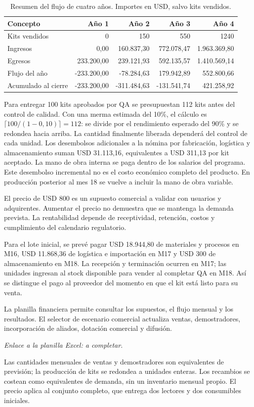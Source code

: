 \begin{table}[H]\centering\small
\caption{Resumen del flujo de cuatro años. Importes en USD, salvo kits vendidos.}\label{tab:flujo-cuatro-anios}
\begin{tabular}{lrrrr}\toprule
Concepto & Año 1 & Año 2 & Año 3 & Año 4\\\midrule
Kits vendidos & 0 & 150 & 550 & 1240\\
Ingresos & 0,00 & 160.837,30 & 772.078,47 & 1.963.369,80\\
Egresos & 233.200,00 & 239.121,93 & 592.135,57 & 1.410.569,14\\
Flujo del año & -233.200,00 & -78.284,63 & 179.942,89 & 552.800,66\\
Acumulado al cierre & -233.200,00 & -311.484,63 & -131.541,74 & 421.258,92\\
\bottomrule\end{tabular}
\end{table}

Para entregar 100 kits aprobados por QA se presupuestan 112 kits antes del control de calidad. Con una merma estimada del 10\%, el cálculo es $\lceil100/(1-0{,}10)\rceil=112$: se divide por el rendimiento esperado del 90\% y se redondea hacia arriba. La cantidad finalmente liberada dependerá del control de cada unidad. Los desembolsos adicionales a la nómina por fabricación, logística y almacenamiento suman USD 31.113,16, equivalentes a USD 311,13 por kit aceptado. La mano de obra interna se paga dentro de los salarios del programa. Este desembolso incremental no es el costo económico completo del producto. En producción posterior al mes 18 se vuelve a incluir la mano de obra variable.

El precio de USD 800 es un supuesto comercial a validar con usuarios y adquirentes. Aumentar el precio no demuestra que se mantenga la demanda prevista. La rentabilidad depende de receptividad, retención, costos y cumplimiento del calendario regulatorio.

Para el lote inicial, se prevé pagar USD 18.944,80 de materiales y procesos en M16, USD 11.868,36 de logística e importación en M17 y USD 300 de almacenamiento en M18. La recepción y terminación ocurren en M17; las unidades ingresan al stock disponible para vender al completar QA en M18. Así se distingue el pago al proveedor del momento en que el kit está listo para su venta.

La planilla financiera permite consultar los supuestos, el flujo mensual y los resultados. El selector de escenario comercial actualiza ventas, demostradores, incorporación de aliados, dotación comercial y difusión.\par\noindent\textit{Enlace a la planilla Excel: a completar.}\par Las cantidades mensuales de ventas y demostradores son equivalentes de previsión; la producción de kits se redondea a unidades enteras. Los recambios se costean como equivalentes de demanda, sin un inventario mensual propio. El precio aplica al conjunto completo, que entrega dos lectores y dos consumibles iniciales.

